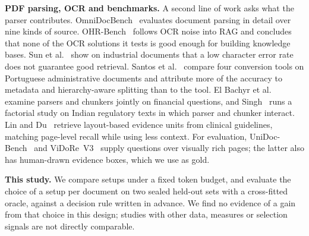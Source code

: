 \textbf{PDF parsing, OCR and benchmarks.} A second line of work asks what the
parser contributes. OmniDocBench~\cite{ouyang2024omnidocbench} evaluates document
parsing in detail over nine kinds of source.
OHR-Bench~\cite{zhang2024ocr} follows OCR noise into RAG and concludes that none
of the OCR solutions it tests is good enough for building knowledge bases. Sun
et al.~\cite{sun2026ocr} show on industrial documents that a low character error
rate does not guarantee good retrieval. Santos et al.~\cite{santos2026pdf} compare
four conversion tools on Portuguese administrative documents and attribute more
of the accuracy to metadata and hierarchy-aware splitting than to the tool.
El Bachyr et al.~\cite{elbachyr2026empirical} examine parsers and chunkers
jointly on financial questions, and Singh~\cite{singh2026parser} runs a factorial
study on Indian regulatory texts in which parser and chunker interact. Lin and
Du~\cite{lin2026pdf} retrieve layout-based evidence units from clinical
guidelines, matching page-level recall while using less context. For evaluation, UniDoc-Bench~\cite{peng2025unidoc} and
ViDoRe~V3~\cite{loison2026vidore} supply questions over visually rich pages; the
latter also has human-drawn evidence boxes, which we use as gold.

\textbf{This study.} We compare setups under a fixed token budget, and
evaluate the choice of a setup per document on two sealed held-out sets with a cross-fitted oracle,
against a decision rule written in advance. We find no evidence of a gain from
that choice in this design; studies with other data, measures or selection
signals are not directly comparable.
